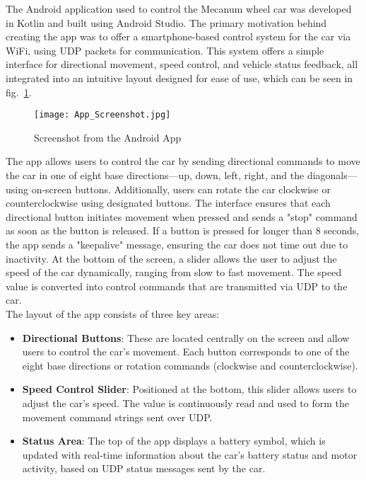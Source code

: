 The Android application used to control the Mecanum wheel car was developed in Kotlin and built using Android Studio. The primary motivation behind creating the app was to offer a smartphone-based control system for the car via WiFi, using UDP packets for communication. This system offers a simple interface for directional movement, speed control, and vehicle status feedback, all integrated into an intuitive layout designed for ease of use, which can be seen in fig.~\ref{fig:AppScreenshot}.

\begin{figure}[h]
	\centering
	\captionsetup{justification=centering}
	\texttt{[image: App\_Screenshot.jpg]}
	\caption{Screenshot from the Android App}
	\label{fig:AppScreenshot}
\end{figure}

The app allows users to control the car by sending directional commands to move the car in one of eight base directions—up, down, left, right, and the diagonals—using on-screen buttons. Additionally, users can rotate the car clockwise or counterclockwise using designated buttons. The interface ensures that each directional button initiates movement when pressed and sends a "stop" command as soon as the button is released. If a button is pressed for longer than 8 seconds, the app sends a "keepalive" message, ensuring the car does not time out due to inactivity.
At the bottom of the screen, a slider allows the user to adjust the speed of the car dynamically, ranging from slow to fast movement. The speed value is converted into control commands that are transmitted via UDP to the car.\\
The layout of the app consists of three key areas:
\begin{itemize}
	\item \textbf{Directional Buttons}: These are located centrally on the screen and allow users to control the car's movement. Each button corresponds to one of the eight base directions or rotation commands (clockwise and counterclockwise).
	\item \textbf{Speed Control Slider}: Positioned at the bottom, this slider allows users to adjust the car's speed. The value is continuously read and used to form the movement command strings sent over UDP.
	\item \textbf{Status Area}: The top of the app displays a battery symbol, which is updated with real-time information about the car’s battery status and motor activity, based on UDP status messages sent by the car.
\end{itemize}

